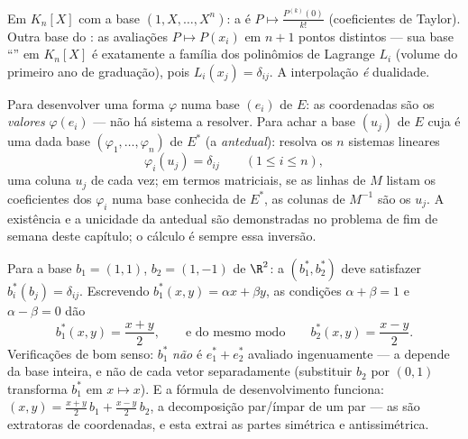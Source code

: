 \begin{example}\label{ex:b2:linalg:dualexamples}
Em $K_n[X]$ com a base $(1, X, \dots, X^n)$: a  é $P
\mapsto \frac{P^{(k)}(0)}{k!}$ (coeficientes de Taylor). Outra base
do : as avaliações $P \mapsto P(x_i)$ em $n + 1$ pontos distintos
--- sua base ``'' em $K_n[X]$ é exatamente a família
dos polinômios de Lagrange $L_i$ (volume do primeiro ano de graduação), pois $L_i(x_j) =
\delta_{ij}$. A interpolação \emph{é} dualidade.
\end{example}

\begin{method}\label{met:b2:linalg:dualbasis}
Para desenvolver uma forma $\varphi$ numa base $(e_i)$ de $E$: as
coordenadas são os \emph{valores} $\varphi(e_i)$ --- não há sistema a
resolver. Para achar a base $(u_j)$ de $E$ cuja  é uma dada
base $(\varphi_1, \dots, \varphi_n)$ de $E^*$ (a
\emph{antedual}): resolva os $n$ sistemas lineares
\[
\varphi_i(u_j) = \delta_{ij} \qquad (1 \leq i \leq n),
\]
uma coluna $u_j$ de cada vez; em termos matriciais, se as linhas de $M$
listam os coeficientes dos $\varphi_i$ numa base conhecida de
$E^*$, as colunas de $M^{-1}$ são os $u_j$. A existência e a
unicidade da antedual são demonstradas no problema de fim de semana deste
capítulo; o cálculo é sempre essa inversão.
\end{method}

\begin{example}\label{ex:b2:linalg:dualbasis2d}
Para a base $b_1 = (1, 1)$, $b_2 = (1, -1)$ de $\R^2$: a
 $(b_1^*, b_2^*)$ deve satisfazer $b_i^*(b_j) =
\delta_{ij}$. Escrevendo $b_1^*(x, y) = \alpha x + \beta y$, as
condições $\alpha + \beta = 1$ e $\alpha - \beta = 0$ dão
\[
b_1^*(x, y) = \frac{x + y}{2},
\qquad\text{e do mesmo modo}\qquad
b_2^*(x, y) = \frac{x - y}{2} .
\]
Verificações de bom senso: $b_1^*$ \emph{não} é $e_1^* + e_2^*$ avaliado
ingenuamente --- a  depende da base inteira, e não de
cada vetor separadamente (substituir $b_2$ por $(0, 1)$ transforma
$b_1^*$ em $x \mapsto x$). E a fórmula de desenvolvimento funciona:
$(x, y) = \frac{x+y}2\,b_1 + \frac{x-y}2\,b_2$, a decomposição
par/ímpar de um par --- as  são extratoras de
coordenadas, e esta extrai as partes simétrica e antissimétrica.
\end{example}

